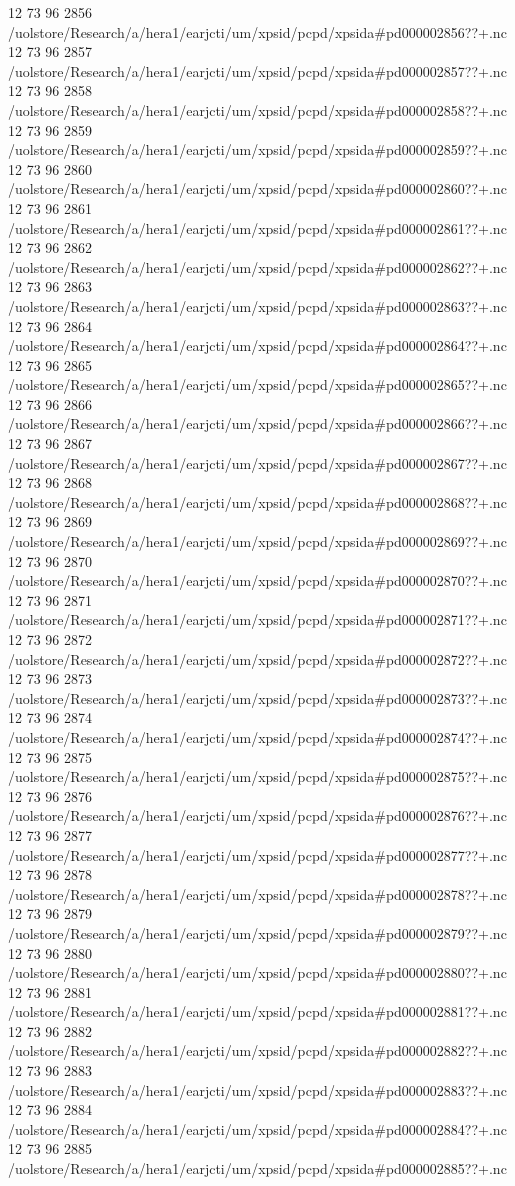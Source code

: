 12 73 96
2856
/uolstore/Research/a/hera1/earjcti/um/xpsid/pcpd/xpsida#pd000002856??+.nc
12 73 96
2857
/uolstore/Research/a/hera1/earjcti/um/xpsid/pcpd/xpsida#pd000002857??+.nc
12 73 96
2858
/uolstore/Research/a/hera1/earjcti/um/xpsid/pcpd/xpsida#pd000002858??+.nc
12 73 96
2859
/uolstore/Research/a/hera1/earjcti/um/xpsid/pcpd/xpsida#pd000002859??+.nc
12 73 96
2860
/uolstore/Research/a/hera1/earjcti/um/xpsid/pcpd/xpsida#pd000002860??+.nc
12 73 96
2861
/uolstore/Research/a/hera1/earjcti/um/xpsid/pcpd/xpsida#pd000002861??+.nc
12 73 96
2862
/uolstore/Research/a/hera1/earjcti/um/xpsid/pcpd/xpsida#pd000002862??+.nc
12 73 96
2863
/uolstore/Research/a/hera1/earjcti/um/xpsid/pcpd/xpsida#pd000002863??+.nc
12 73 96
2864
/uolstore/Research/a/hera1/earjcti/um/xpsid/pcpd/xpsida#pd000002864??+.nc
12 73 96
2865
/uolstore/Research/a/hera1/earjcti/um/xpsid/pcpd/xpsida#pd000002865??+.nc
12 73 96
2866
/uolstore/Research/a/hera1/earjcti/um/xpsid/pcpd/xpsida#pd000002866??+.nc
12 73 96
2867
/uolstore/Research/a/hera1/earjcti/um/xpsid/pcpd/xpsida#pd000002867??+.nc
12 73 96
2868
/uolstore/Research/a/hera1/earjcti/um/xpsid/pcpd/xpsida#pd000002868??+.nc
12 73 96
2869
/uolstore/Research/a/hera1/earjcti/um/xpsid/pcpd/xpsida#pd000002869??+.nc
12 73 96
2870
/uolstore/Research/a/hera1/earjcti/um/xpsid/pcpd/xpsida#pd000002870??+.nc
12 73 96
2871
/uolstore/Research/a/hera1/earjcti/um/xpsid/pcpd/xpsida#pd000002871??+.nc
12 73 96
2872
/uolstore/Research/a/hera1/earjcti/um/xpsid/pcpd/xpsida#pd000002872??+.nc
12 73 96
2873
/uolstore/Research/a/hera1/earjcti/um/xpsid/pcpd/xpsida#pd000002873??+.nc
12 73 96
2874
/uolstore/Research/a/hera1/earjcti/um/xpsid/pcpd/xpsida#pd000002874??+.nc
12 73 96
2875
/uolstore/Research/a/hera1/earjcti/um/xpsid/pcpd/xpsida#pd000002875??+.nc
12 73 96
2876
/uolstore/Research/a/hera1/earjcti/um/xpsid/pcpd/xpsida#pd000002876??+.nc
12 73 96
2877
/uolstore/Research/a/hera1/earjcti/um/xpsid/pcpd/xpsida#pd000002877??+.nc
12 73 96
2878
/uolstore/Research/a/hera1/earjcti/um/xpsid/pcpd/xpsida#pd000002878??+.nc
12 73 96
2879
/uolstore/Research/a/hera1/earjcti/um/xpsid/pcpd/xpsida#pd000002879??+.nc
12 73 96
2880
/uolstore/Research/a/hera1/earjcti/um/xpsid/pcpd/xpsida#pd000002880??+.nc
12 73 96
2881
/uolstore/Research/a/hera1/earjcti/um/xpsid/pcpd/xpsida#pd000002881??+.nc
12 73 96
2882
/uolstore/Research/a/hera1/earjcti/um/xpsid/pcpd/xpsida#pd000002882??+.nc
12 73 96
2883
/uolstore/Research/a/hera1/earjcti/um/xpsid/pcpd/xpsida#pd000002883??+.nc
12 73 96
2884
/uolstore/Research/a/hera1/earjcti/um/xpsid/pcpd/xpsida#pd000002884??+.nc
12 73 96
2885
/uolstore/Research/a/hera1/earjcti/um/xpsid/pcpd/xpsida#pd000002885??+.nc
